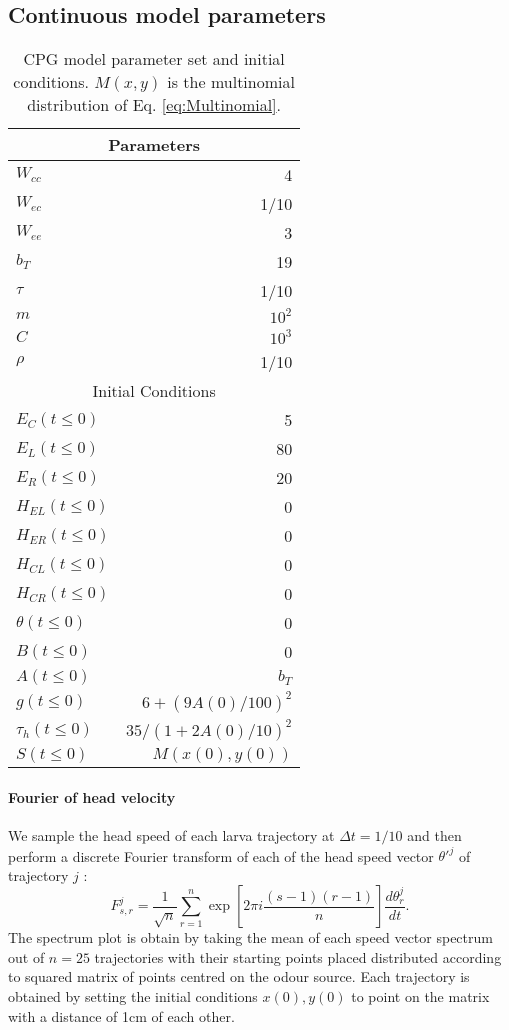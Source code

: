 \documentclass[10pt,a4paper]{article}
\begin{document}
\subsection{Continuous model parameters}
\begin{table}[ht]
 \centering
\begin{tabular}{| l | r |}
 \hline 
\multicolumn{2}{|c|}{Parameters} \\
 \hline 
$W_{cc}$ & 4 \\ \hline
$W_{ec}$ & 1/10\\ \hline
$W_{ee}$ & 3\\ \hline
$b_T$ & 19 \\ \hline
$\tau$ & 1/10 \\ \hline
$m$ & $10^2$ \\ \hline
$C$ & $10^3$ \\ \hline
$\rho$ & 1/10 \\ %
 \hline 
\multicolumn{2}{|c|}{Initial Conditions} \\
 \hline 
$E_C(t \leq 0)$ & 5 \\
$E_L(t \leq 0)$ & 80 \\
$E_R(t \leq 0)$ & 20 \\
$H_{EL}(t \leq 0)$ & 0 \\
$H_{ER}(t \leq 0)$ & 0 \\
$H_{CL}(t \leq 0)$ & 0 \\
$H_{CR}(t \leq 0)$ & 0 \\
$\theta(t \leq 0) $ & 0 \\
$B(t \leq 0) $ & 0 \\
$A(t \leq 0) $ & $b_T$ \\
$g(t \leq 0) $ & $6 + (9 A(0)/100)^2$ \\
$\tau_h(t \leq 0) $ & $35 / (1 + 2A(0)/10)^2$ \\ 
$S(t \leq 0) $ & $M(x(0),y(0))$ \\ \hline
\end{tabular}
 \caption{CPG model parameter set and initial conditions. $M(x,y)$ is the multinomial distribution of Eq. \eqref{eq:Multinomial}. }
 \label{tbl:OscparameterSet}
\end{table}


\paragraph{Fourier of head velocity}
We sample the head speed of each larva trajectory at $\Delta t = 1/10$ and then perform a discrete Fourier transform of each of the head speed vector $\theta'^j$ of trajectory $j$ :
\begin{equation}
F_{s,r}^j = \frac{1}{\sqrt{n}} \sum_{r=1}^n \exp{[2 \pi i \frac{ (s-1)(r-1)}{n}]} \frac{d\theta_r^j}{dt}.
\end{equation}
The spectrum plot is obtain by taking the mean of each speed vector spectrum out of $n=25$ trajectories with their starting points placed distributed according to squared matrix of points centred on the odour source. Each trajectory is obtained by setting the initial conditions $x(0),y(0)$ to point on the matrix with a distance of 1cm of each other.


 
 

\end{document}
